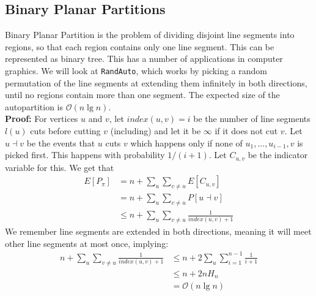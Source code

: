 \documentclass[a4paper, fleqn]{article}
\begin{document}
\subsection*{Binary Planar Partitions}
Binary Planar Partition is the problem of dividing disjoint line segments into regions, so that each region contains only one line segment. This can be represented as binary tree. This has a number of applications in computer graphics. We will look at \texttt{RandAuto}, which works by picking a random permutation of the line segments at extending them infinitely in both directions, until no regions contain more than one segment. The expected size of the autopartition is $\mathcal{O}(n\lg n)$. \\
\textbf{Proof:} For vertices $u$ and $v$, let $index(u,v)=i$ be the number of line segments $l(u)$ cuts before cutting $v$ (including) and let it be $\infty$ if it does not cut $v$. Let $u\dashv v$ be the events that $u$ cuts $v$ which happens only if none of $u_1,\ldots, u_{i-1}, v$ is picked first. This happens with probability $1/(i+1)$. Let $C_{u,v}$ be the indicator variable for this. We get that
\begin{align*}
  E[P_\pi] &= n + \sum_u \sum_{v\neq u} E[C_{u,v}] \\
                                             &=  n + \sum_u \sum_{v\neq u} P[u\dashv v] \\
                                             &\leq n+ \sum_u \sum_{v\neq u} \frac{1}{index(u,v)+1}
\end{align*}
We remember line segments are extended in both directions, meaning it will meet other line segments at most once, implying:
\begin{align*}
  n + \sum_u \sum_{v\neq u} \frac{1}{index(u,v)+1} &\leq  n + 2\sum_u \sum_{i=1}^{n-1} \frac{1}{i+1} \\
                                                   &\leq n+ 2nH_n \\
                                                   &= \mathcal{O}(n\lg n)
\end{align*}
\end{document}
